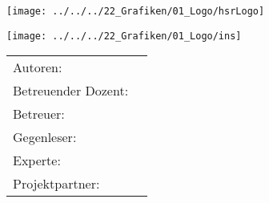 






\begin{titlepage}
\begin{center}
\begin{minipage}[t]{0.45\textwidth}
    \texttt{[image: ../../../22\_Grafiken/01\_Logo/hsrLogo]}
\end{minipage}
\hspace{\fill} %
\begin{minipage}[t]{0.45\textwidth}
    \vspace{-2.9cm}
    \texttt{[image: ../../../22\_Grafiken/01\_Logo/ins]} %
\end{minipage}

\end{center}

\vspace{15ex} %
\begin{center}
	\Huge 
	\begin{framed}
		\textbf{\titel}
	\end{framed}
	
	\vspace{3ex}
	\textbf{\arbeit}
	
	\vspace{1ex}
	\LARGE 
	\place
	
	\vspace{5ex}
	\begin{framed}
		\timeperiod
	\end{framed}
\end{center}

\vspace{11ex}
\begin{tabular}{ll} %
	Autoren:         		& \authors	\\
	Betreuender Dozent:		& \advisorprof  	\\
	Betreuer:        		& \advisor    	\\
	Gegenleser:      		& \contraprof  	\\
	Experte:      			& \expert  		\\
	Projektpartner:      	& \ins  		\\
\end{tabular}

\end{titlepage}

\restoregeometry %
